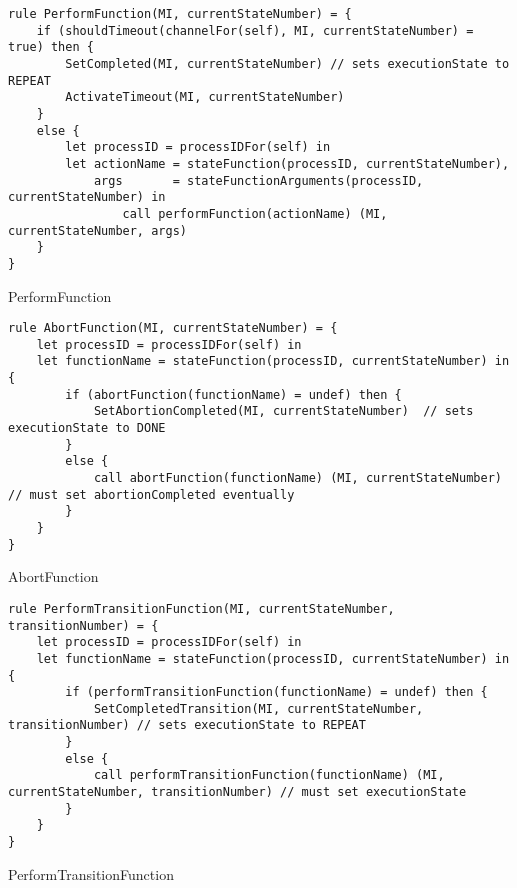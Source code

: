 \begin{listing}[H]
\begin{verbatim}
rule PerformFunction(MI, currentStateNumber) = {
    if (shouldTimeout(channelFor(self), MI, currentStateNumber) = true) then {
        SetCompleted(MI, currentStateNumber) // sets executionState to REPEAT
        ActivateTimeout(MI, currentStateNumber)
    }
    else {
        let processID = processIDFor(self) in
        let actionName = stateFunction(processID, currentStateNumber),
            args       = stateFunctionArguments(processID, currentStateNumber) in
                call performFunction(actionName) (MI, currentStateNumber, args)
    }
}
\end{verbatim}
\caption{PerformFunction}
\label{lst:asm:PerformFunction}
\end{listing}




\begin{listing}[H]
\begin{verbatim}
rule AbortFunction(MI, currentStateNumber) = {
    let processID = processIDFor(self) in
    let functionName = stateFunction(processID, currentStateNumber) in {
        if (abortFunction(functionName) = undef) then {
            SetAbortionCompleted(MI, currentStateNumber)  // sets executionState to DONE
        }
        else {
            call abortFunction(functionName) (MI, currentStateNumber) // must set abortionCompleted eventually
        }
    }
}
\end{verbatim}
\caption{AbortFunction}
\label{lst:asm:AbortFunction}
\end{listing}




\begin{listing}[H]
\begin{verbatim}
rule PerformTransitionFunction(MI, currentStateNumber, transitionNumber) = {
    let processID = processIDFor(self) in
    let functionName = stateFunction(processID, currentStateNumber) in {
        if (performTransitionFunction(functionName) = undef) then {
            SetCompletedTransition(MI, currentStateNumber, transitionNumber) // sets executionState to REPEAT
        }
        else {
            call performTransitionFunction(functionName) (MI, currentStateNumber, transitionNumber) // must set executionState
        }
    }
}
\end{verbatim}
\caption{PerformTransitionFunction}
\label{lst:asm:PerformTransitionFunction}
\end{listing}




